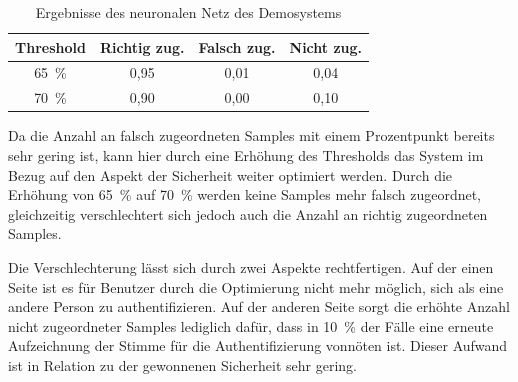 \begin{table}[H]
    \centering
    \begin{tabular}{c|c|c|c}
        Threshold & Richtig zug. & Falsch zug. & Nicht zug. \\ \hline
        65~\%     & 0,95         & 0,01        & 0,04       \\ \hline
        70~\%     & 0,90         & 0,00        & 0,10       \\ 
    \end{tabular}
    \caption{Ergebnisse des neuronalen Netz des Demosystems}
    \label{table:resultsDemoSystemNN}
\end{table}

Da die Anzahl an falsch zugeordneten Samples mit einem Prozentpunkt bereits sehr gering ist, kann hier durch eine Erhöhung des Thresholds das System im Bezug auf den Aspekt der Sicherheit weiter optimiert werden.
Durch die Erhöhung von 65~\% auf 70~\% werden keine Samples mehr falsch zugeordnet, gleichzeitig verschlechtert sich jedoch auch die Anzahl an richtig zugeordneten Samples.

Die Verschlechterung lässt sich durch zwei Aspekte rechtfertigen.
Auf der einen Seite ist es für Benutzer durch die Optimierung nicht mehr möglich, sich als eine andere Person zu authentifizieren.
Auf der anderen Seite sorgt die erhöhte Anzahl nicht zugeordneter Samples lediglich dafür, dass in 10~\% der Fälle eine erneute Aufzeichnung der Stimme für die Authentifizierung vonnöten ist.
Dieser Aufwand ist in Relation zu der gewonnenen Sicherheit sehr gering.

\textauthor{\vHS}{}{}